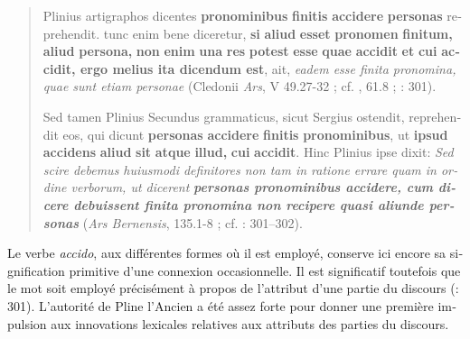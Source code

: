 \documentclass[output=paper]{langsci/langscibook}
\begin{document}
\begin{otherlanguage}{french}
\begin{quote}
    Plinius artigraphos dicentes \textbf{pronominibus} \textbf{finitis} \textbf{accidere} \textbf{personas} reprehendit. tunc enim bene diceretur, \textbf{si} \textbf{aliud} \textbf{esset} \textbf{pronomen} \textbf{finitum,} \textbf{aliud} \textbf{persona,} \textbf{non} \textbf{enim} \textbf{una} \textbf{res} \textbf{potest} \textbf{esse} \textbf{quae} \textbf{accidit} \textbf{et} \textbf{cui} \textbf{accidit, ergo melius ita dicendum est}, ait, \textit{eadem esse finita pronomina, quae sunt etiam personae} (Cledonii \textit{Ars},  V 49.27-32 ; cf. , 61.8 ; \citealt{della_casa_il_1969}: 301).
    
    Sed tamen Plinius Secundus grammaticus, sicut Sergius ostendit, reprehendit eos, qui dicunt \textbf{personas} \textbf{accidere} \textbf{finitis} \textbf{pronominibus}, ut \textbf{ipsud} \textbf{accidens} \textbf{aliud} \textbf{sit} \textbf{atque} \textbf{illud,} \textbf{cui} \textbf{accidit}. Hinc Plinius ipse dixit: \textit{Sed scire debemus huiusmodi definitores non tam in ratione errare quam in ordine verborum, ut dicerent} \textbf{\textit{personas pronominibus accidere, cum dicere debuissent finita pronomina non recipere quasi aliunde personas}} (\textit{Ars Bernensis},  135.1-8 ; cf. \citealt{della_casa_il_1969}: 301–302).
\end{quote}

Le verbe \textit{accido}, aux différentes formes où il est employé, conserve ici encore sa signification primitive d’une connexion occasionnelle. Il est significatif toutefois que le mot soit employé précisément à propos de l’attribut d’une partie du discours (\citealt{della_casa_il_1969}: 301). L’autorité de Pline l’Ancien a été assez forte pour donner une première impulsion aux innovations lexicales relatives aux attributs des parties du discours.


\end{otherlanguage}
\end{document}
